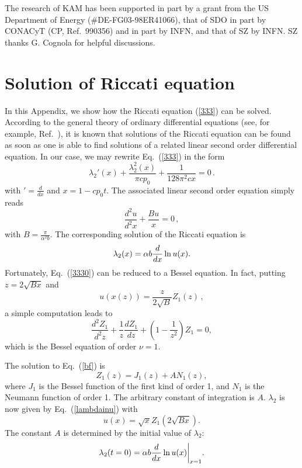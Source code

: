 \documentclass[a4paper,aps,prl,preprint,groupedaddress,showpacs,nobibnotes,tightenlines]{revtex4}
\begin{document}
\begin{acknowledgments}
The research of KAM has been supported in part by a grant from the US
Department of Energy (\#DE-FG03-98ER41066), that of
 SDO  in part by 
CONACyT (CP, Ref.~990356) and in part by INFN, and that of SZ by INFN.
SZ thanks G. Cognola for helpful discussions.
\end{acknowledgments}

\appendix
\section{Solution of Riccati equation}

In this Appendix, we show how the Riccati equation (\ref{333}) can be solved.
According to the general theory of ordinary differential equations 
(see, for example, Ref.~\cite{ince}), it is 
known that  solutions of  
the Riccati equation can be found as soon as one is able to find solutions 
of a related  linear second order differential equation. In our case,
we may rewrite Eq.~(\ref{333}) in the form
\begin{equation}
\lambda_2'(x)+\frac{\lambda_2^2(x)}{\pi c p_0}+\frac{1}{128\pi^2c x}=0\,.
\end{equation}
with $'=\frac{d}{dx}$ and $x=1-cp_0t$. The associated linear 
second order equation simply  reads
\begin{equation}
\frac{d^2 u}{d^2 x}+
\frac{B u}{x}=0\,,
\label{3330}
\end{equation}
with  $B=\frac{\pi}{\alpha^2b}$.  The corresponding  
solution of the Riccati equation is  
\begin{equation}
\lambda_2(x)=\alpha b{d\over dx}\ln u(x).
\label{lambdainu}
\end{equation}
 Fortunately, Eq.~(\ref{3330})
can be reduced to a Bessel equation. In fact,  putting $z=2\sqrt{B x}$
and
\begin{equation}
u(x(z))=\frac{z}{2\sqrt{B }}Z_1(z)\,,
\label{Z}
\end{equation}
a simple computation leads to 
\begin{equation}
\frac{d^2 Z_1}{d^2z}+\frac{1}{z}\frac{d Z_1}{dz}
+\left(1-\frac{1}{z^2}\right)Z_1=0,
\label{bf}
\end{equation}
which is the Bessel equation of order $\nu=1$. 

The solution to Eq.~(\ref{bf}) is
\begin{equation}
Z_1(z)=J_1(z)+AN_1(z),
\end{equation}
where $J_1$ is the Bessel function of the first kind of order 1, and $N_1$
is the Neumann function of order 1.  The arbitrary constant of integration
is $A$.  $\lambda_2$ is now given by Eq.~(\ref{lambdainu}) with
\begin{equation}
u(x)=\sqrt{x}Z_1\left(2\sqrt{Bx}\right).
\end{equation}
The constant $A$ is determined by the initial value of $\lambda_2$:
\begin{equation}
\lambda_2(t=0)=\alpha b{d\over dx}\ln u(x)\bigg|_{x=1}.
\end{equation}
\end{document}
